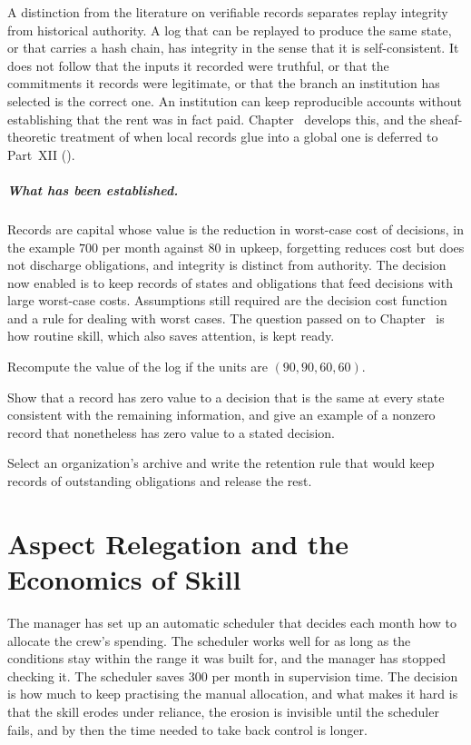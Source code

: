 A distinction from the literature on verifiable records separates replay integrity from historical authority. A log that can be replayed to produce the same state, or that carries a hash chain, has integrity in the sense that it is self-consistent. It does not follow that the inputs it recorded were truthful, or that the commitments it records were legitimate, or that the branch an institution has selected is the correct one. An institution can keep reproducible accounts without establishing that the rent was in fact paid. Chapter~ develops this, and the sheaf-theoretic treatment of when local records glue into a global one is deferred to Part~XII ().

\paragraph{What has been established.} Records are capital whose value is the reduction in worst-case cost of decisions, in the example $700$ per month against $80$ in upkeep, forgetting reduces cost but does not discharge obligations, and integrity is distinct from authority. The decision now enabled is to keep records of states and obligations that feed decisions with large worst-case costs. Assumptions still required are the decision cost function and a rule for dealing with worst cases. The question passed on to Chapter~ is how routine skill, which also saves attention, is kept ready.

\begin{exercise}
Recompute the value of the log if the units are $(90,90,60,60)$.
\end{exercise}
\begin{exercise}
Show that a record has zero value to a decision that is the same at every state consistent with the remaining information, and give an example of a nonzero record that nonetheless has zero value to a stated decision.
\end{exercise}
\begin{exercise}
Select an organization's archive and write the retention rule that would keep records of outstanding obligations and release the rest.
\end{exercise}

\chapter{Aspect Relegation and the Economics of Skill}\label{ch:23}

The manager has set up an automatic scheduler that decides each month how to allocate the crew's spending. The scheduler works well for as long as the conditions stay within the range it was built for, and the manager has stopped checking it. The scheduler saves $300$ per month in supervision time. The decision is how much to keep practising the manual allocation, and what makes it hard is that the skill erodes under reliance, the erosion is invisible until the scheduler fails, and by then the time needed to take back control is longer.

